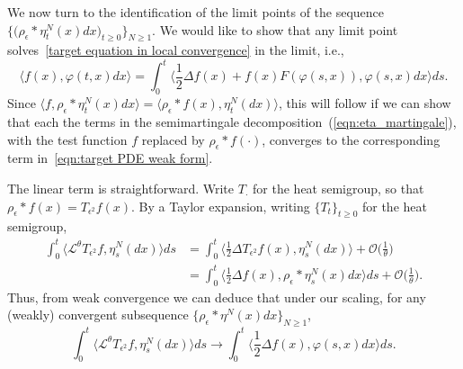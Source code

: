 \documentclass[12pt]{article}
\numberwithin{equation}{section}
\begin{document}
We now turn to the identification of the limit points of the sequence 
$\big\{\big(\rho_\epsilon*\eta_t^N(x)dx\big)_{t\geq 0}\big\}_{N\geq 1}$.
We would like to show that any limit point solves~\eqref{target equation in local convergence}
in the limit, i.e.,
\begin{equation}\label{eqn:target PDE weak form}
    \langle f(x), \varphi(t,x)dx \rangle
    =
    \int_0^t
        \Big\langle
        \frac{1}{2}\Delta f(x) + f(x) F(\varphi(s,x))
        ,
        \varphi(s,x) dx
        \Big\rangle
    ds .
\end{equation}
Since 
$\langle f, \rho_\epsilon*\eta_t^N(x)dx\rangle=
\langle \rho_\epsilon*f(x), \eta_t^N(dx)\rangle$,
this will follow if we can show that each the terms in the semimartingale
decomposition~(\ref{eqn:eta_martingale}),
with the test function $f$ replaced by $\rho_\epsilon*f(\cdot)$,
converges to the corresponding term in~\eqref{eqn:target PDE weak form}.

The linear term is straightforward.
Write $T_{\cdot}$ for the heat semigroup, so that
$\rho_\epsilon*f(x) = T_{\epsilon^2}f(x)$.
By a Taylor expansion, writing $\{T_t\}_{t\geq 0}$ for the heat semigroup,
\begin{align*}
\int_0^t \big\langle \mathcal{L}^\theta T_{\epsilon^2} f, 
	\eta_s^N(dx)\big\rangle ds 
&= \int_0^t \big\langle \frac{1}{2} \Delta T_{\epsilon^2} f(x), 
	\eta_s^N(dx) \big\rangle 
	+ \mathcal{O}\Big(\frac{1}{\theta}\Big) 
\\ &= \int_0^t \big\langle \frac{1}{2} \Delta f(x), \rho_\epsilon* \eta_s^N(x) dx 
	\big\rangle ds + \mathcal{O}\Big(\frac{1}{\theta}\Big).
\end{align*}
Thus, from weak convergence we can deduce that under our scaling,
for any (weakly) convergent subsequence $\{\rho_\epsilon*\eta^N(x)dx\}_{N\geq 1}$,
\[ 
\int_0^t \big\langle \mathcal{L}^\theta T_{\epsilon^2} f, 
\eta_s^N(dx)\big\rangle ds 
\rightarrow \int_0^t \big\langle \frac{1}{2} \Delta f(x), 
\varphi (s,x) dx \big\rangle ds. 
\]
\end{document}
